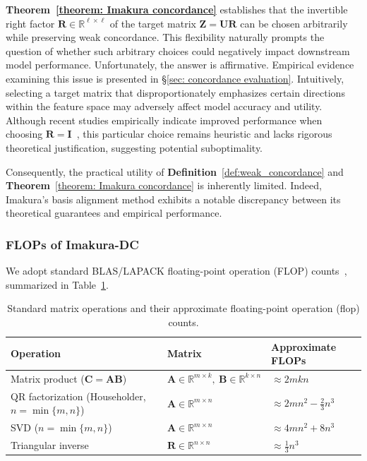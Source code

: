 \documentclass[final,3p,times]{elsarticle}
\theoremstyle{plain}
\newcommand{\matr}[1]{\bm{#1}}        %
\begin{document}
\textbf{Theorem~\ref{theorem: Imakura concordance}} establishes that the invertible right factor \(\matr{R}\in\mathbb{R}^{\ell\times \ell}\) of the target matrix \(\matr{Z}=\matr{U}\matr{R}\) can be chosen arbitrarily while preserving weak concordance. This flexibility naturally prompts the question of whether such arbitrary choices could negatively impact downstream model performance. Unfortunately, the answer is affirmative. Empirical evidence examining this issue is presented in \S\ref{sec: concordance evaluation}. Intuitively, selecting a target matrix that disproportionately emphasizes certain directions within the feature space may adversely affect model accuracy and utility. Although recent studies empirically indicate improved performance when choosing \(\matr{R} = \matr{I}\)~\cite{DCframework1}, this particular choice remains heuristic and lacks rigorous theoretical justification, suggesting potential suboptimality.

Consequently, the practical utility of \textbf{Definition}~\ref{def:weak_concordance} and \textbf{Theorem}~\ref{theorem: Imakura concordance} is inherently limited. Indeed, Imakura's basis alignment method exhibits a notable discrepancy between its theoretical guarantees and empirical performance.

\subsubsection{FLOPs of Imakura-DC}
\label{subsubsec: Imakura FLOPs}

We adopt standard BLAS/LAPACK floating-point operation (FLOP) counts~\cite{GEMM, QR, SVD, trinv}, summarized in Table~\ref{tab:flopdef}.

\begin{table}[h]
\centering
\caption{Standard matrix operations and their approximate floating-point operation (flop) counts.}
\begin{tabular}{lll}
\hline
Operation & Matrix & Approximate FLOPs \\ \hline
Matrix product ($\matr{C} = \matr{A}\matr{B}$)
  & $\matr{A} \in \mathbb{R}^{m \times k},\ \matr{B} \in \mathbb{R}^{k \times n}$
  & $\approx 2 m k n$ \\[4pt]

QR factorization (Householder, $n = \min\{m, n\}$)
  & $\matr{A} \in \mathbb{R}^{m \times n}$
  & $\approx 2 m n^{2} - \tfrac{2}{3} n^{3}$ \\[4pt]

SVD ($n = \min\{m, n\}$)
  & $\matr{A} \in \mathbb{R}^{m \times n}$
  & $\approx 4 m n^{2} + 8 n^{3}$ \\[4pt]

Triangular inverse
  & $\matr{R} \in \mathbb{R}^{n \times n}$
  & $\approx \tfrac{1}{3} n^{3}$ \\ \hline
\end{tabular}
\label{tab:flopdef}
\end{table}
\end{document}
